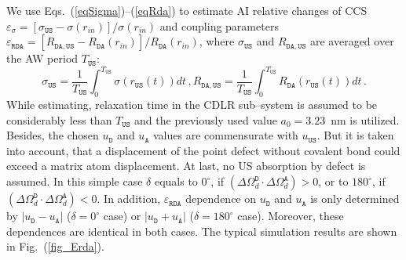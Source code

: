 \documentclass[aip,jap, amsmath,amssymb,reprint]{revtex4-1}
\begin{document}
We use Eqs.~(\ref{eqSigma})--(\ref{eqRda}) to estimate AI relative changes of CCS
$\varepsilon_\sigma=[\sigma_{\mathtt{US}}-\sigma(r_{in})]/\sigma(r_{in})$
and coupling parameters $\varepsilon_{\mathtt{RDA}}=[R_{\mathtt{DA,US}}-R_\mathtt{DA}(r_{in})]/R_\mathtt{DA}(r_{in})$,
where $\sigma_{\mathtt{US}}$ and $R_{\mathtt{DA,US}}$ are averaged over the AW period $T_\mathtt{US}$:
\begin{equation*}
\label{eqAver}
\sigma_{\mathtt{US}}=\frac{1}{T_\mathtt{US}}\int^{T_\mathtt{US}}_0\!\!\!\!\!\!\sigma(r_\mathtt{US}(t))dt\,,
R_{\mathtt{DA,US}}=\frac{1}{T_\mathtt{US}}\int^{T_\mathtt{US}}_0\!\!\!\!\!\!R_{\mathtt{DA}}(r_\mathtt{US}(t))dt\,.
\end{equation*}
While estimating, relaxation time in the CDLR sub--system is assumed to be considerably less than $T_\mathtt{US}$
and the previously used\cite{CDLR:JAP} value $a_0=3.23$~nm is utilized.
Besides, the chosen $u_\mathtt{D}$ and $u_\mathtt{A}$ values are commensurate with $u_\mathtt{US}$.
But it is taken into account, that a displacement of the point defect without covalent bond could exceed a matrix atom displacement.
At last, no US  absorption by defect is assumed.
In this simple case $\delta$ equals to $0^\circ$, if $(\Delta\Omega_d^\mathtt{D}\cdot\Delta\Omega_d^\mathtt{A})>0$,
or to $180^\circ$, if $(\Delta\Omega_d^\mathtt{D}\cdot\Delta\Omega_d^\mathtt{A})<0$.
In addition, $\varepsilon_{\mathtt{RDA}}$ dependence on 
$u_\mathtt{D}$ and $u_\mathtt{A}$
is only determined by $|u_\mathtt{D}-u_\mathtt{A}|$ ($\delta=0^\circ$ case) or $|u_\mathtt{D}+u_\mathtt{A}|$ ($\delta=180^\circ$ case).
Moreover, these dependences are identical in both cases.
The typical simulation results are shown in  Fig.~(\ref{fig_Erda}).

\end{document}

